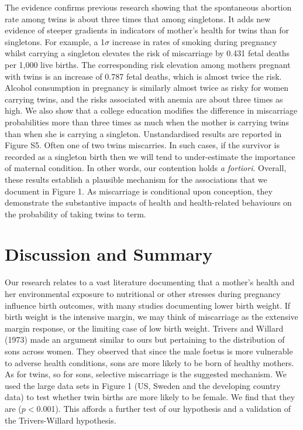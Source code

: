 \documentclass[11pt]{article}
\begin{document}
The evidence confirms previous research showing that the spontaneous abortion rate among twins is about three times that among singletons\cite{Boklage1990}. It adds new evidence of steeper gradients in indicators of mother's health for twins than for singletons. For example, a 1$\sigma$ increase in rates of smoking during pregnancy whilst carrying a singleton elevates the risk of miscarriage by 0.431 fetal deaths per 1,000 live births. The corresponding risk elevation among mothers pregnant with twins is an increase of 0.787 fetal deaths, which is almost twice the risk. Alcohol consumption in pregnancy is similarly almost twice as risky for women carrying twins, and the risks associated with anemia are about three times as high. We also show that a college education modifies the difference in miscarriage probabilities more than three times as much when the mother is carrying twins than when she is carrying a singleton.  Unstandardised results are reported in Figure S5. Often one of two twins miscarries. In such cases, if the survivor is recorded as a singleton birth then we will tend to under-estimate the importance of maternal condition. In other words, our contention holds \emph{a fortiori}.  Overall, these results establish a plausible mechanism for the associations that we document in Figure 1. As miscarriage is conditional upon conception, they demonstrate the substantive impacts of health and health-related behaviours on the probability of taking twins to term.

\section*{Discussion and Summary}
Our research relates to a vast literature documenting that a mother's health and her environmental exposure to nutritional or other stresses during pregnancy influence birth outcomes, with many studies documenting lower birth weight\cite{CurrieMoretti2007,Bernsteinetal2005,SerranoDomeque2014}. If birth weight is the intensive margin, we may think of miscarriage as the extensive margin response, or the limiting case of low birth weight. Trivers and Willard (1973) made an argument similar to ours but pertaining to the distribution of sons across women\cite{TriversWillard1973,AlmondEdlund2007}. They observed that since the male foetus is more vulnerable to adverse health conditions, sons are more likely to be born of healthy mothers. As for twins, so for sons, selective miscarriage is the suggested mechanism. We used the large data sets in Figure 1 (US, Sweden and the developing country data) to test whether twin births are more likely to be female. We find that they are ($p<$0.001). This affords a further test of our hypothesis and a validation of the Trivers-Willard hypothesis.   
\end{document}
